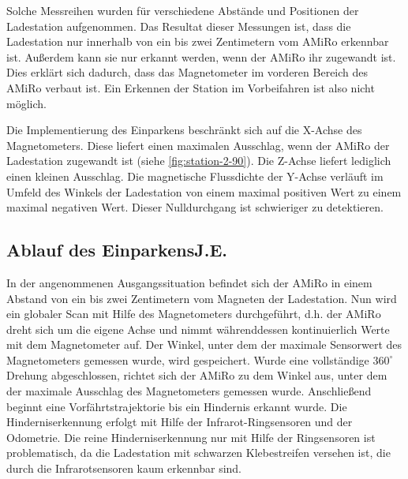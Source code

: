 Solche Messreihen wurden für verschiedene Abstände und Positionen der Ladestation aufgenommen. Das Resultat dieser Messungen ist, dass die Ladestation nur innerhalb von ein bis zwei Zentimetern vom AMiRo erkennbar ist. Außerdem kann sie nur erkannt werden, wenn der AMiRo ihr zugewandt ist. Dies erklärt sich dadurch, dass das Magnetometer im vorderen Bereich des AMiRo verbaut ist. Ein Erkennen der Station im Vorbeifahren ist also nicht möglich.

Die Implementierung des Einparkens beschränkt sich auf die X-Achse des Magnetometers. Diese liefert einen maximalen Ausschlag, wenn der AMiRo der Ladestation zugewandt ist (siehe \ref{fig:station-2-90}). Die Z-Achse liefert lediglich einen kleinen Ausschlag. Die magnetische Flussdichte der Y-Achse verläuft im Umfeld des Winkels der Ladestation von einem maximal positiven Wert zu einem maximal negativen Wert. Dieser Nulldurchgang ist schwieriger zu detektieren.


\begin{figure}
	\caption{}
	\label{fig:messdaten}
\end{figure}

\subsection[Ablauf des Einparkens]{Ablauf des Einparkens\hfill {\normalsize J.E.}}
In der angenommenen Ausgangssituation befindet sich der AMiRo in einem Abstand von ein bis zwei Zentimetern vom Magneten der Ladestation. Nun wird ein globaler Scan mit Hilfe des Magnetometers durchgeführt, d.h. der AMiRo dreht sich um die eigene Achse und nimmt währenddessen kontinuierlich Werte mit dem Magnetometer auf. Der Winkel, unter dem der maximale Sensorwert des Magnetometers gemessen wurde, wird gespeichert. Wurde eine vollständige $360^\circ$ Drehung abgeschlossen, richtet sich der AMiRo zu dem Winkel aus, unter dem der maximale Ausschlag des Magnetometers gemessen wurde. Anschließend beginnt eine Vorfährtstrajektorie bis ein Hindernis erkannt wurde. Die Hinderniserkennung erfolgt mit Hilfe der Infrarot-Ringsensoren und der Odometrie. Die reine Hinderniserkennung nur mit Hilfe der Ringsensoren ist problematisch, da die Ladestation mit schwarzen Klebestreifen versehen ist, die durch die Infrarotsensoren kaum erkennbar sind.

